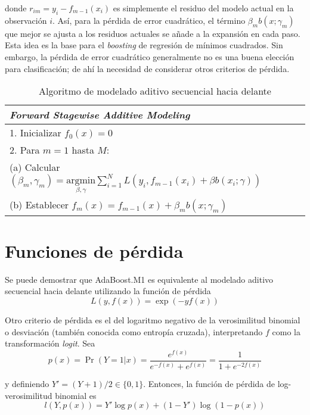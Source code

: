 \noindent donde $r_{im} = y_i - f_{m-1}(x_i)$ es simplemente el residuo del modelo actual en la observación $i$. Así, para la pérdida de error cuadrático, el término $\beta_m b(x; \gamma_m)$ que mejor se ajusta a los residuos actuales se añade a la expansión en cada paso. Esta idea es la base para el \textit{boosting} de regresión de mínimos cuadrados. Sin embargo, la pérdida de error cuadrático generalmente no es una buena elección para clasificación; de ahí la necesidad de considerar otros criterios de pérdida.

\begin{table}[h]
\centering
\begin{tabular}{l}
\toprule\toprule
\textbf{\textit{Forward Stagewise Additive Modeling}} \\
\midrule\midrule
1. Inicializar $f_0(x) = 0$ \\
2. Para $m = 1$ hasta $M$: \\
\quad (a) Calcular $\displaystyle (\beta_m, \gamma_m) = \underset{\beta, \gamma}{\text{argmin}} \sum_{i=1}^{N} L(y_i, f_{m-1}(x_i) + \beta b(x_i; \gamma))$ \\
\quad (b) Establecer $f_m(x) = f_{m-1}(x) + \beta_m b(x; \gamma_m)$ \\
\bottomrule\bottomrule
\end{tabular}
\caption{Algoritmo de modelado aditivo secuencial hacia delante}
\label{tb:10.2}
\end{table}

\section{Funciones de pérdida}

Se puede demostrar que AdaBoost.M1 es equivalente al modelado aditivo secuencial hacia delante utilizando la función de pérdida
\begin{equation}
L(y,f(x)) = \exp(-y f(x))
\end{equation}

Otro criterio de pérdida es el del logaritmo negativo de la verosimilitud binomial o desviación (también conocida como entropía cruzada), interpretando $f$ como la transformación \textit{logit}. Sea
\begin{equation}
p(x) = \Pr(Y = 1 | x) = \frac{e^{f(x)}}{e^{-f(x)} + e^{f(x)}} = \frac{1}{1 + e^{-2 f(x)}}
\end{equation}

\noindent y definiendo $Y' = (Y + 1)/2 \in \{0,1\}$. Entonces, la función de pérdida de log-verosimilitud binomial es
\begin{equation}
l(Y, p(x)) = Y' \log p(x) + (1 - Y') \log(1 - p(x))
\label{eq_boost:10.17}
\end{equation}

